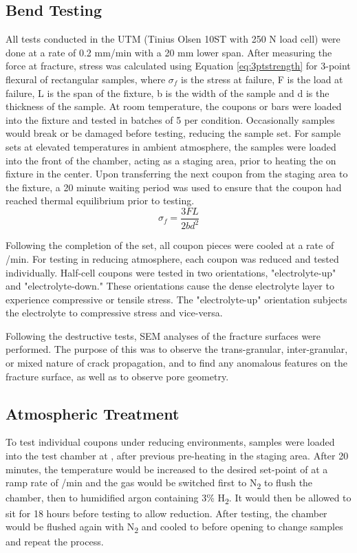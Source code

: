 \subsection{Bend Testing}

All tests conducted in the UTM (Tinius Olsen 10ST with 250 N load cell)
were done at a rate of 0.2 mm/min with a 20 mm lower span.
After measuring the force at fracture, stress was calculated using Equation \ref{eq:3ptstrength}
for 3-point flexural of rectangular samples, where \(\sigma_{f}\) is the stress at failure, F is the load at failure, L is the span of the fixture, b is the width of the sample and d is the thickness of the sample.
At room temperature, the coupons or bars were loaded into the fixture and tested in batches of 5 per condition.
Occasionally samples would break or be damaged before testing, reducing the sample set.
For sample sets at elevated temperatures in ambient atmosphere, the samples were loaded into the front of the chamber, acting as a staging area,
prior to heating the on fixture in the center.
Upon transferring the next coupon from the staging area to the fixture, a 20 minute waiting period was used to ensure that the coupon had reached thermal equilibrium prior to testing.
\begin{equation}
    \sigma_{f} = \frac{3FL}{2bd^{2}}
    \label{eq:3ptstrength}
\end{equation}

Following the completion of the set, all coupon pieces were cooled at a rate of /min.
For testing in reducing atmosphere, each coupon was reduced and tested individually.
Half-cell coupons were tested in two orientations, "electrolyte-up" and "electrolyte-down." These orientations cause the dense electrolyte layer to experience compressive or tensile stress.
The "electrolyte-up" orientation subjects the electrolyte to compressive stress and vice-versa.

Following the destructive tests, SEM analyses of the fracture surfaces were performed.
The purpose of this was to observe the trans-granular,
inter-granular, or mixed nature of crack propagation, and to find any anomalous features on the fracture surface, as well as to observe pore geometry.

\subsection{Atmospheric Treatment}

To test individual coupons under reducing environments, samples were loaded into the test chamber at , after previous pre-heating in the staging area.
After 20 minutes, the temperature would be increased to the desired set-point of  at a ramp rate of /min and the gas would be switched first to N\textsubscript{2} to flush the chamber, then to humidified argon containing 3\% H\textsubscript{2}.
It would then be allowed to sit for 18 hours before testing to allow reduction.
After testing, the chamber would be flushed again with N\textsubscript{2} and cooled to  before opening to change samples and repeat the process.

